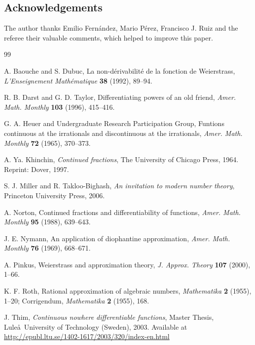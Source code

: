 \documentclass[11pt,a4paper,reqno]{amsart}
\theoremstyle{plain}
\theoremstyle{definition}
\begin{document}

\subsection*{Acknowledgements}
The author thanks Emilio Fern\'andez, Mario P\'erez, Francisco J. Ruiz 
and the referee their valuable comments, which helped to improve this paper.\par

\begin{thebibliography}{99}

A. Baouche and S. Dubuc,
{La non-d\'erivabilit\'e de la fonction de Weierstrass},
\textit{L'Enseignement Math\'ematique} \textbf{38} (1992), 89--94.

R. B. Darst and G. D. Taylor,
{Differentiating powers of an old friend},
\textit{Amer. Math. Monthly} \textbf{103} (1996), 415--416.

G. A. Heuer and Undergraduate Research Participation Group,
{Funtions continuous at the irrationals and discontinuous at the irrationals},
\textit{Amer. Math. Monthly} \textbf{72} (1965), 370--373.

A. Ya. Khinchin,
\textit{Continued fractions},
The University of Chicago Press, 1964.
Reprint: Dover, 1997.

S. J. Miller and R. Takloo-Bighash,
\textit{An invitation to modern number theory},
Princeton University Press, 2006.

A. Norton,
{Continued fractions and differentiability of functions},
\textit{Amer. Math. Monthly} \textbf{95} (1988), 639--643.

J. E. Nymann,
{An application of diophantine approximation},
\textit{Amer. Math. Monthly} \textbf{76} (1969), 668--671.

A. Pinkus,
{Weierstrass and approximation theory},
\textit{J. Approx. Theory} \textbf{107} (2000), 1--66. 

K. F. Roth,
{Rational approximation of algebraic numbers},
\textit{Mathematika} \textbf{2} (1955), 1--20;
{Corrigendum},
\textit{Mathematika} \textbf{2} (1955), 168.

J. Thim,
\textit{Continuous nowhere differentiable functions},
Master Thesis, Lule\aa\ University of Technology (Sweden), 2003.
Available at
\url{http://epubl.ltu.se/1402-1617/2003/320/index-en.html}

\end{thebibliography}

\end{document}
